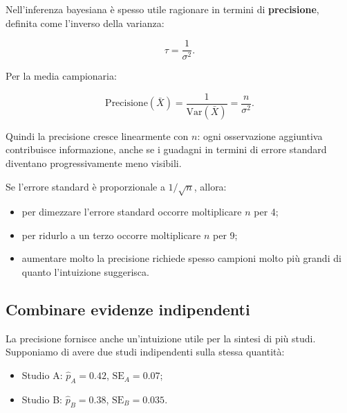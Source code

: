 \documentclass[
  italian,
  letterpaper,
  a4paper,
  11pt,
  open=any]{scrbook}
\providecommand{\tightlist}{%
  \setlength{\itemsep}{0pt}\setlength{\parskip}{0pt}}
\theoremstyle{plain}
\theoremstyle{definition}
\theoremstyle{definition}
\theoremstyle{remark}
\begin{document}
Nell'inferenza bayesiana è spesso utile ragionare in termini di
\textbf{precisione}, definita come l'inverso della varianza:

\[
\tau = \frac{1}{\sigma^2}.
\]

Per la media campionaria:

\[
\text{Precisione}(\bar{X}) = \frac{1}{\text{Var}(\bar{X})} = \frac{n}{\sigma^2}.
\]

Quindi la precisione cresce linearmente con \(n\): ogni osservazione
aggiuntiva contribuisce informazione, anche se i guadagni in termini di
errore standard diventano progressivamente meno visibili.

\begin{tcolorbox}[enhanced jigsaw, arc=.35mm, bottomrule=.15mm, bottomtitle=1mm, breakable, colback=white, colbacktitle=quarto-callout-tip-color!10!white, colframe=quarto-callout-tip-color-frame, coltitle=black, left=2mm, leftrule=.75mm, opacityback=0, opacitybacktitle=0.6, rightrule=.15mm, title=\textcolor{quarto-callout-tip-color}{\faLightbulb}\hspace{0.5em}{Regola pratica}, titlerule=0mm, toprule=.15mm, toptitle=1mm]

Se l'errore standard è proporzionale a \(1/\sqrt{n}\), allora:

\begin{itemize}
\tightlist
\item
  per dimezzare l'errore standard occorre moltiplicare \(n\) per 4;
\item
  per ridurlo a un terzo occorre moltiplicare \(n\) per 9;
\item
  aumentare molto la precisione richiede spesso campioni molto più
  grandi di quanto l'intuizione suggerisca.
\end{itemize}

\end{tcolorbox}

\subsection{Combinare evidenze
indipendenti}\label{combinare-evidenze-indipendenti}

La precisione fornisce anche un'intuizione utile per la sintesi di più
studi. Supponiamo di avere due studi indipendenti sulla stessa quantità:

\begin{itemize}
\tightlist
\item
  Studio A: \(\hat{p}_A = 0.42\), \(\text{SE}_A = 0.07\);
\item
  Studio B: \(\hat{p}_B = 0.38\), \(\text{SE}_B = 0.035\).
\end{itemize}
\end{document}
